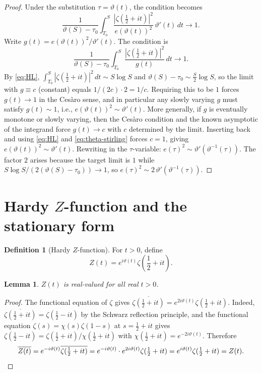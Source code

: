 \documentclass[11pt]{article}
\numberwithin{equation}{section}
\theoremstyle{plain}
\newtheorem{lemma}[theorem]{Lemma}
\theoremstyle{definition}
\newtheorem{definition}[theorem]{Definition}
\begin{document}
\begin{proof}
Under the substitution \(\tau=\vartheta(t)\), the condition becomes
\[
\frac{1}{\vartheta(S)-\tau_0}
\int_{T_0}^S
\frac{|\zeta(\frac12+it)|^2}{e(\vartheta(t))^2}\,\vartheta'(t)\,dt
\to 1.
\]
Write \(g(t)=e(\vartheta(t))^2/\vartheta'(t)\). The condition is
\[
\frac{1}{\vartheta(S)-\tau_0}
\int_{T_0}^S
\frac{|\zeta(\frac12+it)|^2}{g(t)}\,dt
\to 1.
\]
By \eqref{eq:HL}, \(\int_{T_0}^S|\zeta(\frac12+it)|^2\,dt\sim S\log S\) and
\(\vartheta(S)-\tau_0\sim\frac{S}{2}\log S\), so the limit with \(g\equiv c\)
(constant) equals \(1/(2c)\cdot 2=1/c\). Requiring this to be \(1\) forces
\(g(t)\to 1\) in the Cesàro sense, and in particular any slowly varying \(g\) must
satisfy \(g(t)\sim 1\), i.e., \(e(\vartheta(t))^2\sim\vartheta'(t)\). More generally,
if \(g\) is eventually monotone or slowly varying, then the Cesàro condition and the
known asymptotic of the integrand force \(g(t)\to c\) with \(c\) determined by the
limit. Inserting back and using \eqref{eq:HL} and \eqref{eq:theta-stirling} forces
\(c=1\), giving \(e(\vartheta(t))^2\sim\vartheta'(t)\). Rewriting in the
\(\tau\)-variable: \(e(\tau)^2\sim\vartheta'(\vartheta^{-1}(\tau))\). The factor
\(2\) arises because the target limit is \(1\) while
\(S\log S/(2(\vartheta(S)-\tau_0))\to 1\), so \(e(\tau)^2\sim 2\,\vartheta'(\vartheta^{-1}(\tau))\).
\end{proof}

\section{Hardy \(Z\)-function and the stationary form}

\begin{definition}[Hardy \(Z\)-function]
For \(t>0\), define
\begin{equation}
Z(t)=e^{i\vartheta(t)}\zeta\!\left(\frac12+it\right).
\label{eq:Z-def}
\end{equation}
\end{definition}

\begin{lemma}
\(Z(t)\) is real-valued for all real \(t>0\).
\end{lemma}

\begin{proof}
The functional equation of \(\zeta\) gives
\(\overline{\zeta(\frac12+it)}=e^{2i\vartheta(t)}\zeta(\frac12+it)\).
Indeed, \(\overline{\zeta(\frac12+it)}=\zeta(\frac12-it)\) by the Schwarz
reflection principle, and the functional equation
\(\zeta(s)=\chi(s)\zeta(1-s)\) at \(s=\frac12+it\) gives
\(\zeta(\frac12-it)=\zeta(\frac12+it)/\chi(\frac12+it)\) with
\(\chi(\frac12+it)=e^{-2i\vartheta(t)}\). Therefore
\[
\overline{Z(t)}
=e^{-i\vartheta(t)}\overline{\zeta(\tfrac12+it)}
=e^{-i\vartheta(t)}\cdot e^{2i\vartheta(t)}\zeta(\tfrac12+it)
=e^{i\vartheta(t)}\zeta(\tfrac12+it)
=Z(t).
\qedhere
\]
\end{proof}
\end{document}
